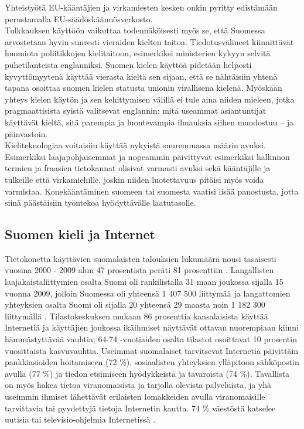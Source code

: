 \begin{multicols}{2}
\cite{OECD2010} Yhteistyötä EU-kääntäjien ja virkamiesten kesken
onkin pyritty edistämään perustamalla EU-säädöskäännösverkosto.\\
Tulkkauksen käyttöön vaikuttaa todennäköisesti myös se, että Suomessa
arvostetaan hyvin suuresti vieraiden kielten taitoa. Tiedotusvälineet
kiinnittävät huomiota poliitikkojen kielitaitoon, esimerkiksi
ministerien kykyyn selvitä puhetilanteista englanniksi. Suomen kielen
käyttöä pidetään helposti kyvyttömyytenä käyttää vierasta kieltä sen
sijaan, että se nähtäisiin yhtenä tapana osoittaa suomen kielen
statusta unionin virallisena kielenä.  Myöskään yhteys kielen käytön
ja sen kehittymisen välillä ei tule aina niiden mieleen, jotka
pragmaattisista syistä valitsevat englannin: mitä useammat
asiantuntijat käyttävät kieltä, sitä parempia ja luontevampia
ilmauksia siihen muodostuu – ja päinvastoin.\\
Kieliteknologiaa voitaisiin käyttää nykyistä suuremmassa
määrin avuksi. Esimerkiksi laajapohjaisemmat ja nopeammin päivittyvät
esimerkiksi hallinnon termien ja fraasien tietokannat olisivat
varmasti avuksi sekä kääntäjille ja tulkeille että virkamiehille,
joskin niiden luotettavuus pitäisi myös voida varmistaa.
Konekääntäminen suomeen tai suomesta vaatisi lisää panostusta, jotta
siinä päästäisiin työntekoa hyödyttävälle laatutasolle.



\subsection{Suomen kieli ja Internet}

Tietokonetta käyttävien suomalaisten talouksien lukumäärä nousi
tasaisesti vuosina 2000 - 2009 alun 47 prosentista peräti 81
prosenttiin \cite{OECD-ICT}. Langallisten laajakaistaliittymien osalta
Suomi oli rankilistalla 31 maan joukossa sijalla 15 vuonna 2009,
jolloin Suomessa oli yhteensä 1 407 500 liittymää \cite{OECD-wired} ja
langattomien yhteyksien osalta Suomi oli sijalla 20 yhteensä 29 maasta
noin 1 182 300 liittymällä \cite{OECD-mobile}. 
Tilastokeskuksen mukaan
86 prosenttia kansalaisista käyttää Internetiä ja käyttäjien joukossa
ikäihmiset näyttävät ottavan nuorempiaan kiinni hämmästyttävää
vauhtia; 64-74 -vuotiaiden osalta tilastot osoittavat 10 prosentin
vuosittaista kasvuvauhtia. Useimmat suomalaiset tarvitsevat Internetiä
päivittäin pankkiasioiden hoitamiseen (72 \%), sosiaalisten
yhteyksien ylläpitoon sähköpostin avulla (77 \%) ja tiedon
etsimiseen hyödykkeistä ja tavaroista (74 \%). Tavallista on
myös hakea tietoa viranomaisista ja tarjolla olevista palveluista, ja
yhä useimmin ihmiset lähettävät erilaisten lomakkeiden avulla
viranomaisille tarvittavia tai pyydettyjä tietoja Internetin
kautta. 74 \% väestöstä katselee uutisia tai televisio-ohjelmia Internetissä \cite{SVT}.


\end{multicols}
